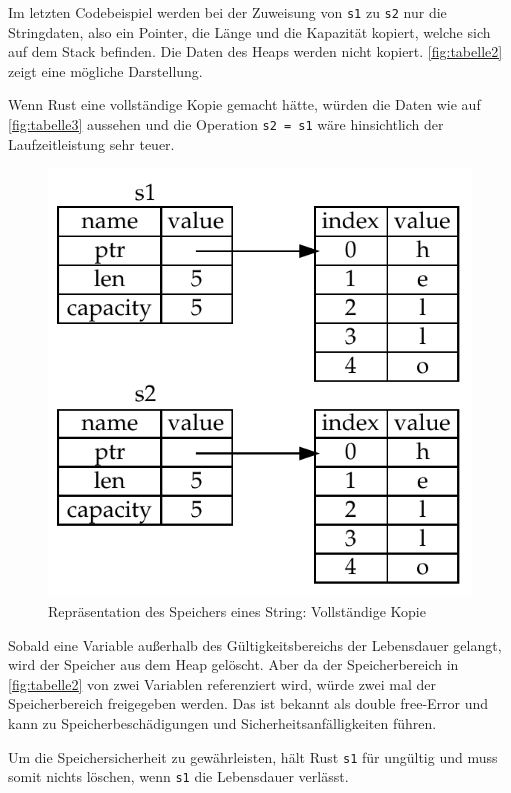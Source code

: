 Im letzten Codebeispiel werden bei der Zuweisung von \verb"s1" zu \verb"s2" nur die Stringdaten, also ein Pointer, die Länge und die Kapazität kopiert, welche sich auf dem Stack befinden. Die Daten des Heaps werden nicht kopiert. \autoref{fig:tabelle2} zeigt eine mögliche Darstellung.

Wenn Rust eine vollständige Kopie gemacht hätte, würden die Daten wie auf \autoref{fig:tabelle3} aussehen und die Operation \verb"s2 = s1" wäre hinsichtlich der Lauf\-zeit\-leis\-tung sehr teuer.

\begin{figure}[htbp]
    \centering
    \includegraphics[scale=0.9]{Programmierung/Tabelle3.pdf}
    \caption{Repräsentation des Speichers eines String: Vollständige Kopie}
    \label{fig:tabelle3}
\end{figure}

Sobald eine Variable außerhalb des Gültigkeitsbereichs der Lebensdauer gelangt, wird der Spei\-cher aus dem Heap gelöscht. Aber da der Speicherbereich in \autoref{fig:tabelle2} von zwei Variablen referenziert wird, würde zwei mal der Speicherbereich freigegeben werden. Das ist bekannt als \glqq double free\grqq{}-Error und kann zu Speicherbeschädigungen und Sicherheitsanfälligkeiten führen.

Um die Speichersicherheit zu gewährleisten, hält Rust \verb"s1" für ungültig und muss somit nichts löschen, wenn \verb"s1" die Lebensdauer verlässt.


